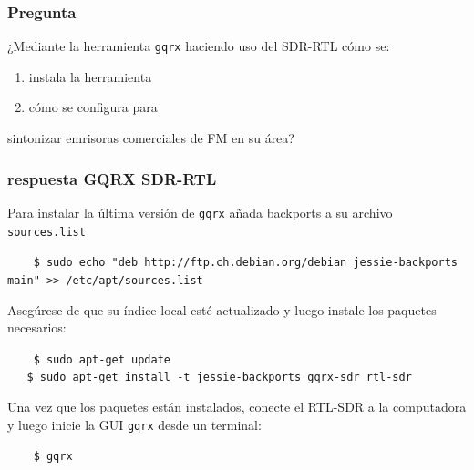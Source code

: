 \begin{frame}
\frametitle{Pregunta}

¿Mediante la herramienta {\tt gqrx} haciendo uso del SDR-RTL cómo 
se:
\begin{enumerate}
 
\item instala la herramienta
\item cómo se configura para 
\end{enumerate}

sintonizar emrisoras comerciales de FM en su área? 




\end{frame}

\begin{frame}
\frametitle{respuesta GQRX SDR-RTL }


Para instalar la última versión de {\tt gqrx} añada backports a su archivo {\tt sources.list}

\begin{block}{}
  \texttt{
  \ \ \ \$ sudo echo "deb http://ftp.ch.debian.org/debian jessie-backports main" >> /etc/apt/sources.list
}
\end{block} 

Asegúrese de que su índice local esté actualizado y luego instale los paquetes necesarios: 

\begin{block}{}
  \texttt{
  \ \ \ \$ sudo apt-get update \\
  \ \ \ \$ sudo apt-get install -t jessie-backports gqrx-sdr rtl-sdr  \\
}
\end{block} 

Una vez que los paquetes están instalados, conecte el RTL-SDR a la computadora y luego inicie la GUI {\tt gqrx} desde un terminal: 


\begin{block}{}
  \texttt{
  \ \ \ \$ gqrx
}
\end{block} 


\end{frame}


